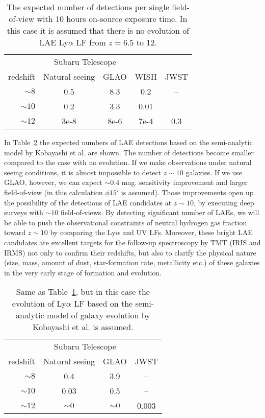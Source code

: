 \begin{table}[!ht]
\begin{center}
\begin{tabular}{rcccc}
\hline
 & \multicolumn{2}{c}{Subaru Telescope} & \\
\cline{2-3}
 redshift & Natural seeing & GLAO & WISH & JWST\\
\hline
 $\sim8$  & 0.5 & 8.3 & 0.2 & --\\
 $\sim10$ & 0.2 & 3.3 & 0.01 & -- \\
 $\sim12$ & 3e-8 & 8e-6 & 7e-4 & 0.3\\
\hline
\end{tabular}
\end{center}
\caption{
The expected number of detections per single field-of-view with 10 hours
 on-source exposure time. In this case it is assumed that there is no
 evolution of LAE Ly$\alpha$ LF from $z=6.5$ \citep{Kashikawa2011} to
 12. 
}
\label{tab:iwata_lae_num1}
\end{table}

In Table~\ref{tab:iwata_lae_num2} the expected numbers of LAE detections
based on the semi-analytic model by Kobayashi et al. are shown.
The number of detections become smaller compared to the case with no
evolution. If we make observations under natural seeing
conditions, it is almost impossible to detect $z\sim10$ galaxies. If we
use GLAO, however, we can expect $\sim0.4$ mag. sensitivity improvement
and larger field-of-view (in this calculation $\phi15'$ is
assumed). Those improvements open up the possibility of the detections
of LAE candidates at $z\sim10$, by executing deep surveys with $\sim10$
field-of-views. 
By detecting significant number of LAEs, we will be able to push the
observational constraints of neutral hydrogen gas fraction toward
$z\sim10$ by comparing the Ly$\alpha$ and UV LFs.
Moreover, these bright LAE candidates are excellent targets for
the follow-up spectroscopy by TMT (IRIS and IRMS) not only to confirm
their redshifts, but also to clarify the physical nature (size, mass,
amount of dust, star-formation rate, metallicity etc.) of these
galaxies in the very early stage of formation and evolution.


\begin{table}[!htbp]
\begin{center}
\begin{tabular}{rccc}
\hline
 & \multicolumn{2}{c}{Subaru Telescope} & \\
\cline{2-3}
 redshift & Natural seeing & GLAO & JWST\\
\hline
 $\sim8$  & 0.4 & 3.9 & -- \\
 $\sim10$ & 0.03 & 0.5 & -- \\
 $\sim12$ & $\sim0$ & $\sim0$ &  0.003\\
\hline
\end{tabular}
\end{center}
\caption{
Same as Table~\ref{tab:iwata_lae_num1}, but in this case the evolution
 of Ly$\alpha$ LF based on the semi-analytic model of galaxy evolution
 by Kobayashi et al. is assumed.
}
\label{tab:iwata_lae_num2}
\end{table}


